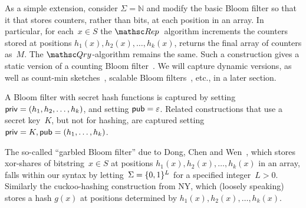 As a simple extension, consider $\Sigma=\mathbb{N}$ and modify the
basic Bloom filter so that it that stores counters, rather than
bits, at each position in an array.  In particular, for each~$x \in
S$ the $\Rep$~algorithm increments the counters stored at positions
$h_1(x), h_2(x), \ldots, h_k(x)$, returns the final array of
counters as~$M$.  The $\Qry$-algorithm remains the same. Such a
construction gives a static version of a counting Bloom
filter~\cite{xxx}.  We will capture dynamic versions, as well as
count-min sketches~\cite{xxx}, scalable Bloom filters~\cite{xxx},
etc., in a later section.

A Bloom filter with secret hash functions is captured by setting ${\sf priv}=(h_1,h_2,\ldots,h_k)$, and setting ${\sf pub}=\varepsilon$.  Related constructions  that use a secret key~$K$, but not for hashing, are captured setting ${\sf priv}=K, {\sf pub}=(h_1, \ldots, h_k)$.

The so-called ``garbled Bloom filter'' due to Dong, Chen and Wen~\cite{xxx}, which stores xor-shares of bitstring~$x \in S$ at positions $h_1(x),h_2(x),\ldots,h_k(x)$ in an array, falls within our syntax by letting~$\Sigma=\{0,1\}^L$ for a specified integer~$L>0$.  Similarly the cuckoo-hashing construction from NY, which (loosely speaking) stores a hash $g(x)$ at positions determined by $h_1(x),h_2(x),\ldots,h_k(x)$. 
